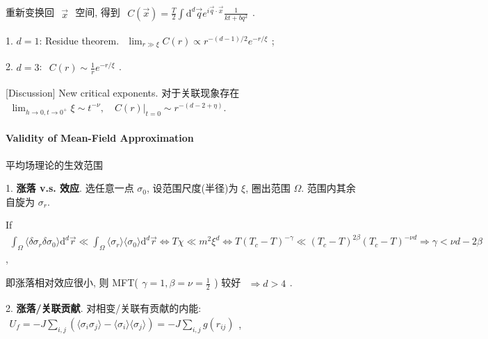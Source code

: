 \documentclass[../../main.tex]{subfiles}
\begin{document}
重新变换回 $\begin{aligned}
    \vec{x}
\end{aligned}$ 空间, 得到 $\begin{aligned}
    C\left(\vec{x}\right) = \frac{T}{2}\int\mathrm{d}^{d}\vec{q}e^{i\vec{q}\cdot\vec{x}}\frac{1}{kt+bq^{2}}
\end{aligned}$. 

1. $d=1$: Residue theorem. $\begin{aligned} 
    \lim_{r\gg\xi}C(r) \propto r^{-(d-1)/2}e^{-r/\xi}
\end{aligned}$;

2. $d=3$: $\begin{aligned}
    C(r) \sim \frac{1}{r}e^{-r/\xi}
\end{aligned}$. 

[Discussion] New critical exponents. 对于关联现象存在 $\begin{aligned}
    \lim_{h\rightarrow 0,t\rightarrow 0^{+}}\xi\sim t^{-\nu},\quad C(r)\bigg|_{t=0}\sim r^{-(d-2+\eta)}.
\end{aligned}$

\paragraph{Validity of Mean-Field Approximation} 平均场理论的生效范围

1. \textbf{涨落 v.s. 效应}. 选任意一点 $\sigma_{0}$, 设范围尺度(半径)为 $\xi$, 圈出范围 $\Omega$. 范围内其余自旋为 $\sigma_{r}$. 

If $\begin{aligned}
    \int_{\Omega}\langle\delta\sigma_{r}\delta\sigma_{0}\rangle\mathrm{d}^{d}\vec{r}\ll \int_{\Omega}\langle\sigma_{r}\rangle\langle\sigma_{0}\rangle\mathrm{d}^{d}\vec{r}\Leftrightarrow T\chi\ll m^{2}\xi^{d}\Leftrightarrow T(T_{c}-T)^{-\gamma}\ll (T_{c}-T)^{2\beta}(T_{c}-T)^{-\nu d}\Rightarrow \gamma < \nu d-2\beta
\end{aligned}$, 

即涨落相对效应很小, 则 MFT($\begin{aligned}
    \gamma = 1, \beta = \nu = \frac{1}{2}
\end{aligned}$) 较好 $\begin{aligned}
    \Rightarrow \boxed{d>4}
\end{aligned}$. 

2. \textbf{涨落/关联贡献}. 对相变/关联有贡献的内能: $\begin{aligned}
    U_{f} = -J\sum_{i,j}\left(
        \langle\sigma_{i}\sigma_{j}\rangle - \langle\sigma_{i}\rangle\langle\sigma_{j}\rangle
    \right) = -J\sum_{i,j}g(r_{ij})
\end{aligned}$, 
\end{document}

